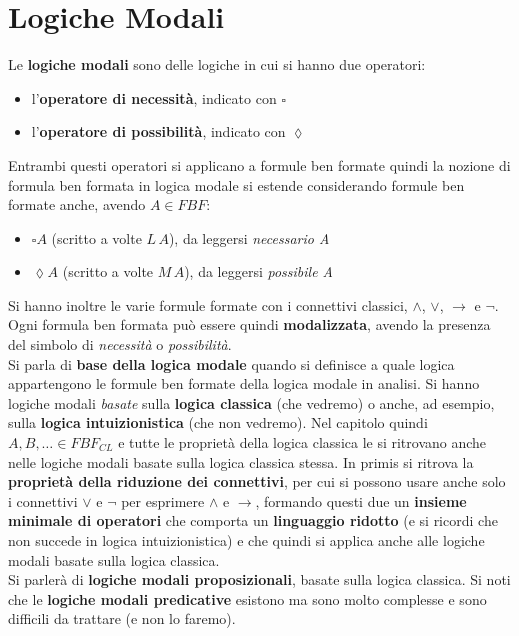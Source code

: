 \documentclass[a4paper,12pt, oneside]{book}
\begin{document}
\chapter{Logiche Modali}
Le \textbf{logiche modali} sono delle logiche in cui si hanno due operatori:
\begin{itemize}
  \item l'\textbf{operatore di necessità}, indicato con $\square$
  \item l'\textbf{operatore di possibilità}, indicato con $\lozenge$
\end{itemize}
Entrambi questi operatori si applicano a formule ben formate quindi la nozione
di formula ben formata in logica modale si estende considerando formule ben
formate anche, avendo $A\in FBF$:
\begin{itemize}
  \item $\square A$ (scritto a volte $L\,A$), da leggersi \textit{necessario
    A} 
  \item $\lozenge A$ (scritto a volte $M\,A$), da leggersi \textit{possibile
    A} 
\end{itemize}
Si hanno inoltre le varie formule formate con i connettivi classici, $\land$,
$\lor$, $\to$ e $\neg$. Ogni formula ben formata può essere quindi
\textbf{modalizzata}, avendo la presenza del simbolo di \textit{necessità} o
\textit{possibilità}. \\
Si parla di \textbf{base della logica modale} quando si definisce a quale logica
appartengono le formule ben formate della logica modale in analisi. Si hanno
logiche modali \textit{basate} sulla \textbf{logica classica} (che vedremo) o
anche, ad esempio, sulla \textbf{logica intuizionistica} (che non vedremo).
Nel capitolo quindi $A,B,\ldots \in FBF_{CL}$ e tutte le proprietà della logica
classica le si ritrovano anche nelle logiche modali basate sulla logica classica
stessa. In primis si ritrova la \textbf{proprietà della riduzione dei
  connettivi}, per cui si possono usare anche solo i connettivi $\lor$ e $\neg$
per esprimere $\land$ e $\to$, formando questi due un \textbf{insieme minimale
  di operatori} che comporta un \textbf{linguaggio ridotto} (e si ricordi che
non succede in logica intuizionistica) e che quindi si applica anche alle
logiche modali basate sulla logica classica.\\
Si parlerà di \textbf{logiche modali proposizionali}, basate sulla logica
classica. Si noti che le \textbf{logiche modali predicative} esistono ma sono
molto complesse e sono difficili da trattare (e non lo faremo).\\
\end{document}
